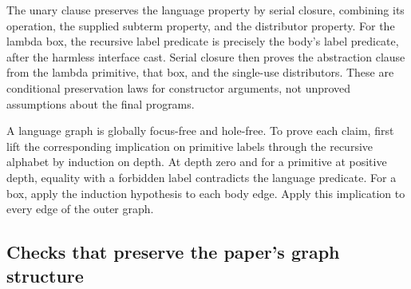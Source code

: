 





The unary clause preserves the language property by serial closure,
combining its operation, the supplied subterm property, and the distributor
property. For the lambda box, the recursive label predicate is precisely
the body's label predicate, after the harmless interface cast. Serial closure
then proves the abstraction clause from the lambda primitive, that box,
and the single-use distributors. These are conditional preservation laws
for constructor arguments, not unproved assumptions about the final programs.




A language graph is globally focus-free and hole-free. To prove each
claim, first lift the corresponding implication on primitive labels through
the recursive alphabet by induction on depth. At depth zero and for a
primitive at positive depth, equality with a forbidden label contradicts
the language predicate. For a box, apply the induction hypothesis to each
body edge. Apply this implication to every edge of the outer graph.



\subsection{Checks that preserve the paper's graph structure}

